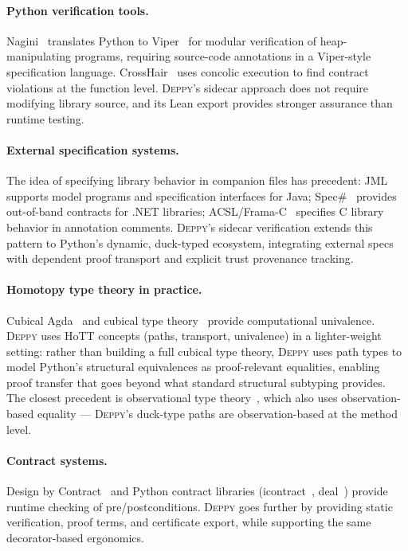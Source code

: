 \documentclass[acmsmall,nonacm,screen]{acmart}
\newcommand{\deppy}{\textsc{Deppy}}
\begin{document}
\paragraph{Python verification tools.}
Nagini~\cite{nagini} translates Python to Viper~\cite{viper} for
modular verification of heap-manipulating programs, requiring
source-code annotations in a Viper-style specification language.
CrossHair~\cite{crosshair} uses concolic execution to find
contract violations at the function level.
\deppy{}'s sidecar approach does not require modifying library source,
and its Lean export provides stronger assurance than runtime testing.

\paragraph{External specification systems.}
The idea of specifying library behavior in companion files has
precedent: JML~\cite{jml} supports model programs and specification
interfaces for Java; Spec\#~\cite{specsharp} provides
out-of-band contracts for .NET libraries; ACSL/Frama-C~\cite{framac}
specifies C library behavior in annotation comments.  \deppy{}'s
sidecar verification extends this pattern to Python's dynamic,
duck-typed ecosystem, integrating external specs with dependent proof
transport and explicit trust provenance tracking.

\paragraph{Homotopy type theory in practice.}
Cubical Agda~\cite{cubicalagda} and cubical type theory~\cite{cchm}
provide computational univalence.  \deppy{} uses HoTT concepts
(paths, transport, univalence) in a lighter-weight setting: rather
than building a full cubical type theory, \deppy{} uses path types
to model Python's structural equivalences as proof-relevant
equalities, enabling proof transfer that goes beyond what standard
structural subtyping provides.  The closest precedent is
observational type theory~\cite{altenkirch-ott}, which also uses
observation-based equality --- \deppy{}'s duck-type paths are
observation-based at the method level.

\paragraph{Contract systems.}
Design by Contract~\cite{meyer1992} and Python contract
libraries (icontract~\cite{icontract}, deal~\cite{deal}) provide
runtime checking of pre/postconditions.  \deppy{} goes further by
providing static verification, proof terms, and certificate export,
while supporting the same decorator-based ergonomics.
\end{document}
